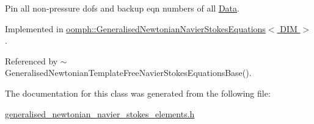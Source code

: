 Pin all non-\/pressure dofs and backup eqn numbers of all \hyperlink{classoomph_1_1Data}{Data}. 



Implemented in \hyperlink{classoomph_1_1GeneralisedNewtonianNavierStokesEquations_a5b85b22f90a38b141620ec1720070311}{oomph\+::\+Generalised\+Newtonian\+Navier\+Stokes\+Equations$<$ D\+I\+M $>$}.



Referenced by $\sim$\+Generalised\+Newtonian\+Template\+Free\+Navier\+Stokes\+Equations\+Base().



The documentation for this class was generated from the following file\+:\begin{DoxyCompactItemize}
\item 
\hyperlink{generalised__newtonian__navier__stokes__elements_8h}{generalised\+\_\+newtonian\+\_\+navier\+\_\+stokes\+\_\+elements.\+h}\end{DoxyCompactItemize}
